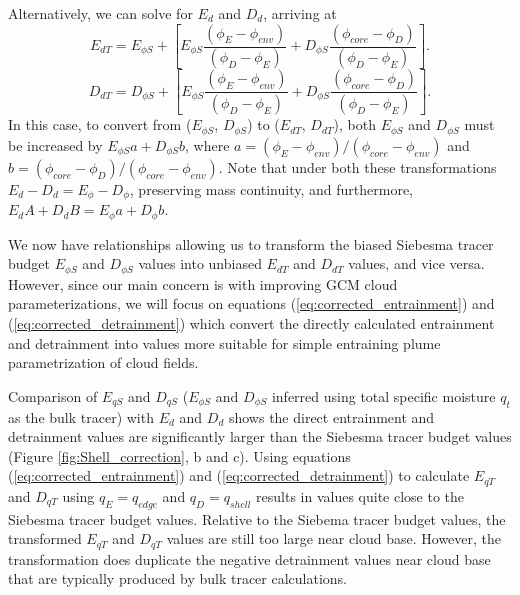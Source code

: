 \documentclass[12pt]{article}
\begin{document}
Alternatively, we can solve for $E_d$ and $D_d$, arriving at
\begin{equation}
  \label{eq:corrected_entrainment2}
    E_{d T} = E_{\phi S} 
        + \left[E_{\phi S}\frac{(\phi_E - \phi_{env})}{(\phi_D - \phi_E)} 
              + D_{\phi S}\frac{(\phi_{core} - \phi_D)}{(\phi_D - \phi_E)}\right].
\end{equation}
\begin{equation}
  \label{eq:corrected_detrainment2}
    D_{d T} = D_{\phi S} 
        + \left[E_{\phi S}\frac{(\phi_E - \phi_{env})}{(\phi_D - \phi_E)}
              + D_{\phi S}\frac{(\phi_{core} - \phi_D)}{(\phi_D - \phi_E)}\right].
\end{equation}
In this case, to convert from ($E_{\phi S}$, $D_{\phi S}$) to 
($E_{dT}$, $D_{dT}$), both $E_{\phi S}$ and $D_{\phi S}$ must be increased by 
$E_{\phi S} a + D_{\phi S} b$, where 
$a = (\phi_E - \phi_{env})/(\phi_{core} - \phi_{env})$ and 
$b = (\phi_{core} - \phi_D)/(\phi_{core} - \phi_{env})$.  Note that under both these transformations $E_d-D_d = E_{\phi}-D_{\phi}$, preserving mass continuity,
and furthermore, $E_d A + D_d B = E_{\phi} a + D_{\phi} b$.

We now have relationships allowing us to transform the biased Siebesma tracer
budget $E_{\phi S}$ and $D_{\phi S}$  values into unbiased $E_{dT}$ and $D_{dT}$
values, and vice versa.  However, since our main concern is with improving GCM
cloud parameterizations, we will focus on equations 
(\ref{eq:corrected_entrainment}) and (\ref{eq:corrected_detrainment}) which 
convert the directly calculated entrainment and detrainment into values 
more suitable for simple entraining plume parametrization of cloud fields.

Comparison of $E_{q S}$ and $D_{q S}$ ($E_{\phi S}$ and $D_{\phi S}$ inferred
using total specific moisture $q_t$ as the bulk tracer) with $E_d$ and $D_d$
shows the direct entrainment and detrainment values are significantly larger 
than the Siebesma tracer budget values (Figure \ref{fig:Shell_correction}, 
b and c).  Using equations (\ref{eq:corrected_entrainment}) and 
(\ref{eq:corrected_detrainment}) to calculate $E_{q T}$ and $D_{q T}$ using 
$q_E = q_{edge}$ and $q_D = q_{shell}$ results in values quite close to 
the Siebesma tracer budget values.  Relative to the Siebema tracer budget
values, the transformed $E_{q T}$ and $D_{q T}$ values are still too large 
near cloud base.  However, the transformation does duplicate the negative 
detrainment values near cloud base that are typically produced by bulk tracer
calculations.
\end{document}
